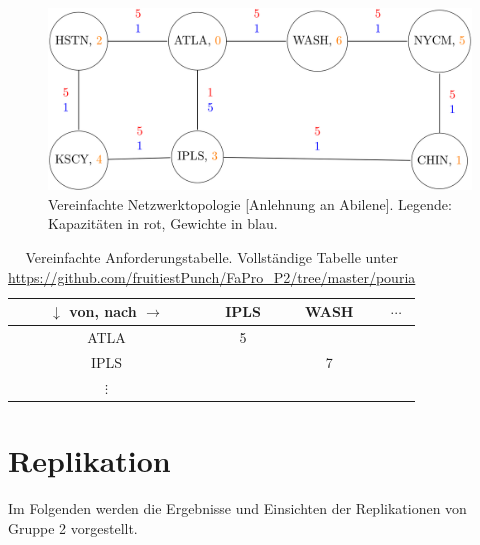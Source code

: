 \documentclass[sigconf, nonacm, review]{acmart}
\begin{document}
\begin{figure}
\centering
\includegraphics[width=\linewidth]{figures/pouria_simple_topology.png}
\caption{Vereinfachte Netzwerktopologie [Anlehnung an Abilene]. Legende: Kapazit\"aten in rot, Gewichte in blau.}
\label{fig:pouriaSimpleTopology}
\end{figure}
\begin{table}
\caption{Vereinfachte Anforderungstabelle. Vollst\"andige Tabelle unter \url{https://github.com/fruitiestPunch/FaPro_P2/tree/master/pouria}}
\label{tab:pouriaSimpleTopology}
\begin{tabular}{cccc}
\toprule
$\downarrow$ von, nach $\rightarrow$&IPLS&WASH&$\cdots$\\
\midrule
ATLA & 5 & &\\
IPLS & & 7 & \\
$\vdots$ & & & \\
\bottomrule
\end{tabular}
\end{table}
\section{Replikation}
Im Folgenden werden die Ergebnisse und Einsichten der Replikationen von Gruppe 2 vorgestellt.
\end{document}
